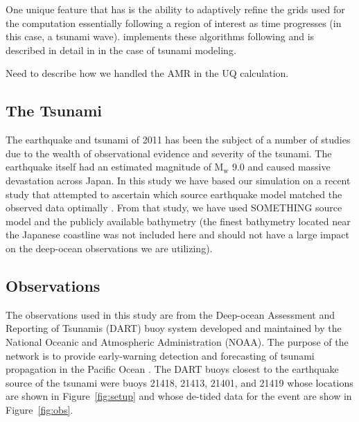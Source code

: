 One unique feature that \geoclaw has is the ability to adaptively refine the grids used for the computation essentially following a region of interest as time progresses (in this case, a tsunami wave).  \geoclaw implements these algorithms following \cite{Berger:1984ui,Berger:1998aa} and is described in detail in \cite{Berger:2011du} in the case of tsunami modeling.

\alert{Need to describe how we handled the AMR in the UQ calculation.}

\subsection{The \tohoku Tsunami} \label{ssub:tohoku}

The \tohoku earthquake and tsunami of 2011 has been the subject of a number of studies due to the wealth of observational evidence and severity of the tsunami.  The earthquake itself had an estimated magnitude of $\text{M}_\text{w}$ 9.0 and caused massive devastation across Japan.  In this study we have based our simulation on a recent study that attempted to ascertain which source earthquake model matched the observed data optimally \cite{MacInnes:2013cr}.  From that study, we have used \alert{SOMETHING} source model and the publicly available bathymetry (the finest bathymetry located near the Japanese coastline was not included here and should not have a large impact on the deep-ocean observations we are utilizing).

\subsection{Observations}

The observations used in this study are from the Deep-ocean Assessment and Reporting of Tsunamis (DART) buoy system developed and maintained by the National Oceanic and Atmospheric Administration (NOAA).  The purpose of the network is to provide early-warning detection and forecasting of tsunami propagation in the Pacific Ocean \cite{Percival:2011}.  The DART buoys closest to the earthquake source of the \tohoku tsunami were buoys 21418, 21413, 21401, and 21419 whose locations are shown in Figure~\ref{fig:setup} and whose de-tided data for the event are show in Figure~\ref{fig:obs}.


